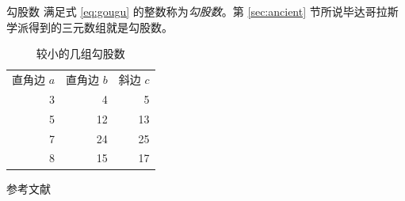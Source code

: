\documentclass[no-math,xcolor=table]{beamer}
\begin{document}
\begin{frame}{勾股数}
满足式 \eqref{eq:gougu} 的整数称为\emph{勾股数}。第 \ref{sec:ancient} 节所说毕达哥拉斯学派得到的三元数组就是勾股数。
\begin{table}
\centering
\begin{tabular}{rrr}
\rowcolor{craneorange}直角边 $a$ & 直角边 $b$ & 斜边 $c$\\
3 & 4 & 5 \\
5 & 12 & 13 \\
7 & 24 & 25 \\
8 & 15 & 17 \\
\end{tabular}
\caption{较小的几组勾股数}
\end{table}
\end{frame}

\begin{frame}{参考文献}
\nocite{Shiye}

\end{frame}
\end{document}
